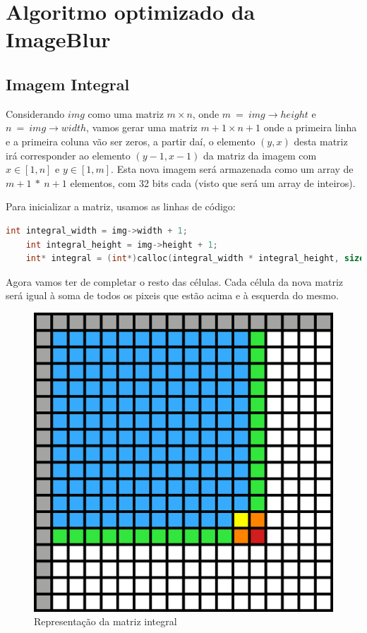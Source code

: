 \section{Algoritmo optimizado da ImageBlur}
\label{sec:imageblur/optimal}

\subsection{Imagem Integral}

Considerando $img$ como uma matriz $m \times n$, onde $m~=~img\rightarrow height$ e $n~=~img\rightarrow width$, vamos gerar uma matriz $m+1 \times n+1$ onde a primeira linha e a primeira coluna vão ser zeros, a partir daí, o elemento $(y,x)$ desta matriz irá corresponder ao elemento $(y-1,x-1)$ da matriz da imagem com $x\in[1,n]$ e $y\in[1,m]$. Esta nova imagem será armazenada como um array de $m+1~*~n+1$ elementos, com 32 bits cada (visto que será um array de inteiros).

Para inicializar a matriz, usamos as linhas de código:

\begin{lstlisting}[language=C]
    int integral_width = img->width + 1;
    int integral_height = img->height + 1;
    int* integral = (int*)calloc(integral_width * integral_height, sizeof(int));
\end{lstlisting}

Agora vamos ter de completar o resto das células. Cada célula da nova matriz será igual à soma de todos os pixeis que estão acima e à esquerda do mesmo.

\begin{figure}[H]
    \centering
    \includegraphics[width=0.4\linewidth]{images/integral-matrix.png}
    \caption{Representação da matriz integral}
\end{figure}

